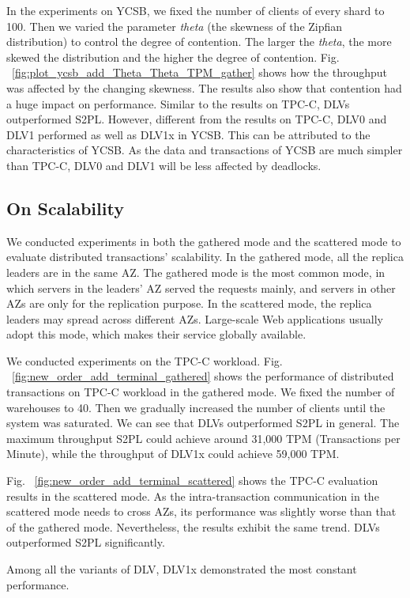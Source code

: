 \documentclass[conference]{IEEEtran}
\begin{document}
In the experiments on YCSB, we fixed the number of clients of every shard to 100.
Then we varied the parameter \emph{theta} (the skewness of the Zipfian distribution) to control the degree of contention.
The larger the \emph{theta}, the more skewed the distribution and the higher the degree of contention.
Fig. ~\ref{fig:plot_ycsb_add_Theta_Theta_TPM_gather} shows how the throughput was affected by the changing skewness.
The results also show that contention had a huge impact on performance.
Similar to the results on TPC-C, DLVs outperformed S2PL.
However, different from the results on TPC-C, DLV0 and DLV1 performed as well as DLV1x in YCSB.
This can be attributed to the characteristics of YCSB. As the data and transactions of YCSB are much simpler than TPC-C, DLV0 and DLV1 will be less affected by deadlocks.

\subsection{On Scalability}

We conducted experiments in both the gathered mode and the scattered mode to evaluate distributed transactions' scalability.
In the gathered mode, all the replica leaders are in the same AZ.
The gathered mode is the most common mode, in which servers in the leaders' AZ served the requests mainly, and servers in other AZs are only for the replication purpose.
In the scattered mode, the replica leaders may spread across different AZs.
Large-scale Web applications usually adopt this mode, which makes their service globally available.

We conducted experiments on the TPC-C workload.
Fig. ~\ref{fig:new_order_add_terminal_gathered} shows the performance of distributed transactions on TPC-C workload in the gathered mode.
We fixed the number of warehouses to 40.
Then we gradually increased the number of clients until the system was saturated.
We can see that DLVs outperformed S2PL in general.
The maximum throughput S2PL could achieve around 31,000 TPM (Transactions per Minute),
while the throughput of DLV1x could achieve 59,000 TPM.


Fig. ~\ref{fig:new_order_add_terminal_scattered}  shows the TPC-C evaluation results in the scattered mode.
As the intra-transaction communication in the scattered mode needs to cross AZs, its performance was slightly worse than that of the gathered mode.
Nevertheless, the results exhibit the same trend. DLVs outperformed S2PL significantly.

Among all the variants of DLV, DLV1x demonstrated the most constant performance.
\end{document}
